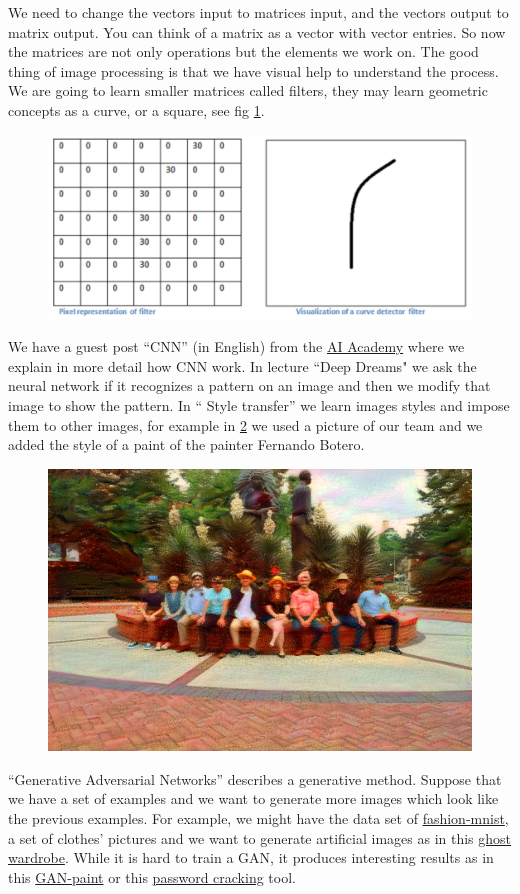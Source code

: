 \documentclass[11pt,letterpaper]{report}
\begin{document}
	We need to change the vectors input to matrices input,  and the vectors output to matrix output. You can think of a matrix as a vector with vector entries.  So now the matrices are not only operations but the elements we work on.
	The good thing of image processing is that we have visual help to understand the process. We are going to learn smaller matrices called filters, they may learn geometric concepts as a curve, or a square, see fig \ref{fig:filter}.  
	
	\begin{figure}[h!]
		\centering
		\includegraphics[width=0.45\linewidth]{figures/filter.png}
		\caption{}
		\label{fig:filter}
	\end{figure} 	

    We have a guest post ``CNN'' (in English) from the \href{https://aiacademy.tw}{AI Academy}\cite{wai} where
	 we explain in more detail how CNN work. In lecture ``Deep Dreams" we ask the neural network if it recognizes a pattern on an image and then we modify that image to show the pattern. In `` Style transfer'' we learn images styles and impose them to other images, for example  in \ref{fig:botero} we used a picture of our team and we added the style of a paint of the painter Fernando Botero. %
	
	
	\begin{figure}[h!]
		\centering
		\includegraphics[width=0.45\linewidth]{figures/botero.png}
		\caption{}
		\label{fig:botero}
	\end{figure} 	
	
	
	``Generative Adversarial Networks'' describes a generative method. Suppose that we have a set of examples and we want to generate more images which look like the previous examples. For example, we might have the data set of
	\href{https://github.com/zalandoresearch/fashion-mnist}{fashion-mnist}\cite{wfashion}, a set of  clothes' pictures and we want to generate artificial images as in this \href{https://github.com/spaceLenny/FashionDCGANExample}{ghost wardrobe}\cite{wghost}. While it is hard to train a GAN, it produces interesting results as in this \href{ https://twitter.com/henddkn/status/1067431379804262400?s=19 } {GAN-paint}\cite{wtwitter} or this 
	\href{    https://towardsdatascience.com/password-cracker-generating-passwords-with-recurrent-neural-networks-lstms-9583714a3310 
	}{password cracking}\cite{wpassword} tool.
	
\end{document}

